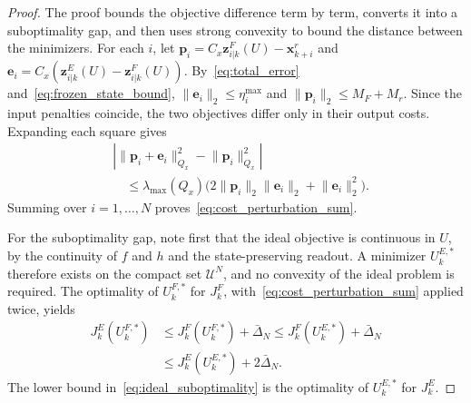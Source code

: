 \documentclass[journal]{IEEEtran}
\newcommand{\vp}{\mathbf{p}}
\newcommand{\vx}{\mathbf{x}}
\newcommand{\ve}{\mathbf{e}}
\newcommand{\vz}{\mathbf{z}}
\newcommand{\norm}[2][]{\mathopen{#1\lVert}#2\mathclose{#1\rVert}}
\theoremstyle{plain}
\theoremstyle{definition}
\theoremstyle{definition}
\begin{document}
\begin{proof}
The proof bounds the objective difference term by term, converts it
into a suboptimality gap, and then uses strong convexity to bound the
distance between the minimizers. For each $i$, let
$\vp_i=C_x\vz_{i|k}^F(U)-\vx_{k+i}^r$ and
$\ve_i=C_x(\vz_{i|k}^E(U)-\vz_{i|k}^F(U))$. By~\eqref{eq:total_error}
and~\eqref{eq:frozen_state_bound}, $\norm{\ve_i}_2\le\eta_i^{\max}$
and $\norm{\vp_i}_2\le M_F+M_r$. Since the input penalties coincide,
the two objectives differ only in their output costs. Expanding each
square gives
\begin{equation}
\begin{aligned}
&|\norm{\vp_i+\ve_i}_{Q_x}^2-\norm{\vp_i}_{Q_x}^2|\\
&\quad\le\lambda_{\max}(Q_x)\big(2\norm{\vp_i}_2\norm{\ve_i}_2
+\norm{\ve_i}_2^2\big).
\end{aligned}
\label{eq:cost_perturbation}
\end{equation}
Summing over $i=1,\ldots,N$ proves~\eqref{eq:cost_perturbation_sum}.

For the suboptimality gap, note first that the ideal objective is
continuous in $U$, by the continuity of $f$ and $h$ and the
state-preserving readout. A minimizer $U_k^{E,*}$ therefore exists on
the compact set $\mathcal U^N$, and no convexity of the ideal problem
is required. The optimality of $U_k^{F,*}$ for $J_k^F$,
with~\eqref{eq:cost_perturbation_sum} applied twice, yields
\begin{equation*}
\begin{aligned}
J_k^E(U_k^{F,*})&\le J_k^F(U_k^{F,*})+\bar\Delta_N
\le J_k^F(U_k^{E,*})+\bar\Delta_N\\
&\le J_k^E(U_k^{E,*})+2\bar\Delta_N.
\end{aligned}
\end{equation*}
The lower bound in~\eqref{eq:ideal_suboptimality} is the optimality
of $U_k^{E,*}$ for $J_k^E$.


\end{proof}
\end{document}
